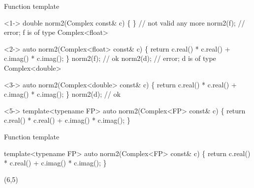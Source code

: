 \begin{frame}[fragile]{Function template}

  \begin{codeblock}<1->{
double norm2(Complex const\& c) \{ \ddd \} // not valid any more
norm2(f);                             // error; f is of type Complex<float>}\end{codeblock}

  \begin{codeblock}<2->{
auto norm2(Complex<\alert<4-5>{float}> const\& c) \{
  return c.real() * c.real() + c.imag() * c.imag();
\}
norm2(f); // ok
norm2(d); // error; d is of type Complex<double>}\end{codeblock}

  \begin{codeblock}<3->{
auto norm2(Complex<\alert<4-5>{double}> const\& c) \{
  return c.real() * c.real() + c.imag() * c.imag();
\}
norm2(d); // ok}\end{codeblock}

  \begin{codeblock}<5->{
template<typename \alert<5>{FP}>
auto norm2(Complex<\alert<5>{FP}> const\& c) \{
  return c.real() * c.real() + c.imag() * c.imag();
\}
}\end{codeblock}

\end{frame}

\begin{frame}[fragile]{Function template \insertcontinuationtext}

  \begin{codeblock}
template<typename \alert<2>{FP}>
auto norm2(\alert<2>{Complex<FP>} const\& c)
\{ return c.real() * c.real() + c.imag() * c.imag(); \}



\end{codeblock}

  \begin{textblock}{6}(6,5)
  \end{textblock}

\end{frame}

